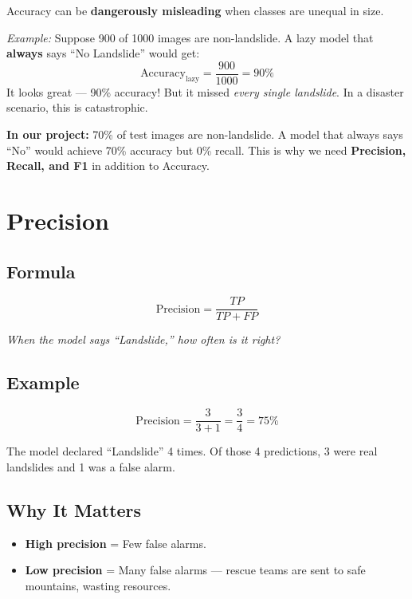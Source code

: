 \documentclass[11pt]{article}
\begin{document}
Accuracy can be \textbf{dangerously misleading} when classes are unequal in size.

\medskip
\noindent\textit{Example:} Suppose 900 of 1000 images are non-landslide.
A lazy model that \textbf{always} says ``No Landslide'' would get:
\[
\text{Accuracy}_{\text{lazy}} = \frac{900}{1000} = 90\%
\]
It looks great --- 90\% accuracy!
But it missed \emph{every single landslide}.
In a disaster scenario, this is catastrophic.

\medskip
\noindent\textbf{In our project:} 70\% of test images are non-landslide.
A model that always says ``No'' would achieve 70\% accuracy but 0\% recall.
This is why we need \textbf{Precision, Recall, and F1} in addition to Accuracy.

\section{Precision}

\subsection{Formula}
\[
\text{Precision} = \frac{TP}{TP + FP}
\]

\noindent\textit{When the model says ``Landslide,'' how often is it right?}

\subsection{Example}
\[
\text{Precision} = \frac{3}{3 + 1} = \frac{3}{4} = \boxed{75\%}
\]

\noindent The model declared ``Landslide'' 4 times. Of those 4 predictions, 3 were real landslides and 1 was a false alarm.

\subsection{Why It Matters}

\begin{itemize}[noitemsep]
    \item \textbf{High precision} = Few false alarms.
    \item \textbf{Low precision} = Many false alarms --- rescue teams are sent to safe mountains, wasting resources.
\end{itemize}
\end{document}
